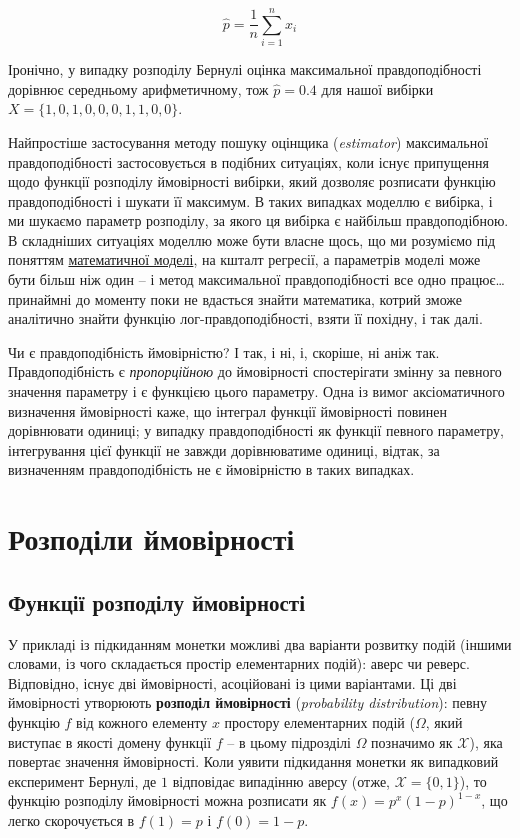 \documentclass[
  11pt,
]{book}
\begin{document}
\[\hat{p} = \frac{1}{n} \sum \limits_{i=1}^n x_i\]

Іронічно, у випадку розподілу Бернулі оцінка максимальної правдоподібності дорівнює середньому арифметичному, тож \(\hat{p} = 0.4\) для нашої вибірки \(X = \{1, 0, 1, 0, 0, 0, 1, 1, 0, 0\}\).

Найпростіше застосування методу пошуку оцінщика (\emph{estimator}) максимальної правдоподібності застосовується в подібних ситуаціях, коли існує припущення щодо функції розподілу ймовірності вибірки, який дозволяє розписати функцію правдоподібності і шукати її максимум. В таких випадках моделлю є вибірка, і ми шукаємо параметр розподілу, за якого ця вибірка є найбільш правдоподібною. В складніших ситуаціях моделлю може бути власне щось, що ми розуміємо під поняттям \hyperref[stat-models]{математичної моделі}, на кшталт регресії, а параметрів моделі може бути більш ніж один -- і метод максимальної правдоподібності все одно працює\ldots{} принаймні до моменту поки не вдасться знайти математика, котрий зможе аналітично знайти функцію лог-правдоподібності, взяти її похідну, і так далі.

Чи є правдоподібність ймовірністю? І так, і ні, і, скоріше, ні аніж так. Правдоподібність є \emph{пропорційною} до ймовірності спостерігати змінну за певного значення параметру і є функцією цього параметру. Одна із вимог аксіоматичного визначення ймовірності каже, що інтеграл функції ймовірності повинен дорівнювати одиниці; у випадку правдоподібності як функції певного параметру, інтегрування цієї функції не завжди дорівнюватиме одиниці, відтак, за визначенням правдоподібність не є ймовірністю в таких випадках.

\section{Розподіли ймовірності}\label{pdf-pmf}

\subsection{Функції розподілу ймовірності}\label{pdfs}

У прикладі із підкиданням монетки можливі два варіанти розвитку подій (іншими словами, із чого складається простір елементарних подій): аверс чи реверс. Відповідно, існує дві ймовірності, асоційовані із цими варіантами. Ці дві ймовірності утворюють \textbf{розподіл ймовірності} (\emph{probability distribution}): певну функцію \(f\) від кожного елементу \(x\) простору елементарних подій (\(\Omega\), який виступає в якості домену функції \(f\) -- в цьому підрозділі \(\Omega\) позначимо як \(\mathcal{X}\)), яка повертає значення ймовірності. Коли уявити підкидання монетки як випадковий експеримент Бернулі, де \(1\) відповідає випадінню аверсу (отже, \(\mathcal{X} = \{0, 1\}\)), то функцію розподілу ймовірності можна розписати як \(f(x) = p^x (1-p)^{1-x}\), що легко скорочується в \(f(1) = p\) і \(f(0) = 1 - p\).
\end{document}
